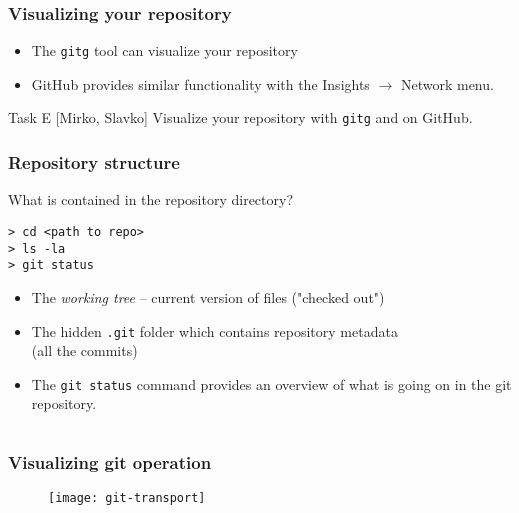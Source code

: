 
\begin{frame}

\frametitle{Visualizing your repository}

\begin{itemize}
	\item The \texttt{gitg} tool can visualize your repository
	\item GitHub provides similar functionality with the Insights $\rightarrow$ Network menu.
\end{itemize}

\begin{block}{Task E [Mirko, Slavko]}
	Visualize your repository with \texttt{gitg} and on GitHub.
\end{block}

\end{frame}


\begin{frame}[fragile]

\frametitle{Repository structure}

What is contained in the repository directory?
	
\begin{verbatim}
> cd <path to repo>
> ls -la
> git status
\end{verbatim}
	
\begin{itemize}
	\item The \textit{working tree} -- current version of files ("checked out")
	\item The hidden \texttt{.git} folder which contains repository metadata \\ (all the commits)
	\item The \texttt{git status} command provides an overview of what is going on in the git repository.
\end{itemize}
\begin{verbatim}
\end{verbatim}
	
\end{frame}


\begin{frame}
	\frametitle{Visualizing git operation}
	
	\begin{figure}
		\texttt{[image: git-transport]}
	\end{figure}
\end{frame}

